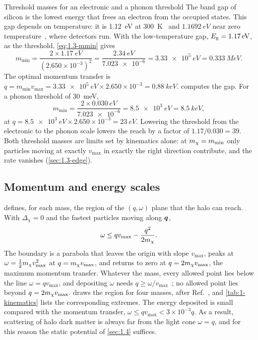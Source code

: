 \begin{workedexample}{Threshold masses for an electronic and a phonon threshold}\label{we:1-mmin}
The band gap of silicon is the lowest energy that frees an electron from the occupied states. This gap depends on temperature: it is \SI{1.12}{eV} at \SI{300}{K}~\cite[Table~I]{ramanathan2020ionization} and $\SI{1.1692}{eV}$ near zero temperature~\cite[Eq.~(11)]{ramanathan2020ionization}, where detectors run. With the low-temperature gap, $E_{\mathrm{g}} = \SI{1.17}{eV}$, as the threshold, \cref{eq:1.3-mmin} gives
\begin{equation*}
  m_{\mathrm{min}} = \frac{2 \times \SI{1.17}{eV}}{(2.650\times10^{-3})^2} = \frac{\SI{2.34}{eV}}{\num{7.023e-6}} = \SI{3.33e5}{eV} = \SI{0.333}{MeV}.
\end{equation*}
The optimal momentum transfer is $q = m_{\mathrm{min}}v_{\mathrm{max}} = \SI{3.33e5}{eV}\times 2.650\times10^{-3} = \SI{0.88}{keV}$.  computes the gap. For a phonon threshold of \SI{30}{meV},
\begin{equation*}
  m_{\mathrm{min}} = \frac{2 \times \SI{0.030}{eV}}{\num{7.023e-6}} = \SI{8.5e3}{eV} = \SI{8.5}{keV},
\end{equation*}
at $q = \SI{8.5e3}{eV}\times 2.650\times10^{-3} = \SI{23}{eV}$. Lowering the threshold from the electronic to the phonon scale lowers the reach by a factor of $1.17/0.030 = 39$. Both threshold masses are limits set by kinematics alone: at $m_{\chi} = m_{\mathrm{min}}$ only particles moving at exactly $v_{\mathrm{max}}$ in exactly the right direction contribute, and the rate vanishes (\cref{sec:1.3-edge}).
\end{workedexample}

\subsection{Momentum and energy scales}

 defines, for each mass, the region of the $(q, \omega)$ plane that the halo can reach. With $\Delta_\chi = 0$ and the fastest particles moving along $\bm{q}$,
\begin{equation}
  \omega \le q v_{\mathrm{max}} - \frac{q^2}{2m_{\chi}} .
  \label{eq:1.3-region}
\end{equation}
The boundary is a parabola that leaves the origin with slope $v_{\mathrm{max}}$, peaks at $\omega = \tfrac12m_{\chi} v_{\mathrm{max}}^2$ at $q = m_{\chi} v_{\mathrm{max}}$, and returns to zero at $q = 2m_{\chi} v_{\mathrm{max}}$, the maximum momentum transfer. Whatever the mass, every allowed point lies below the line $\omega = qv_{\mathrm{max}}$, and depositing $\omega$ needs $q \ge \omega/v_{\mathrm{max}}$~\cite[Eq.~(122)]{kahn2022searches}; no allowed point lies beyond $q = 2m_{\chi} v_{\mathrm{max}}$.  draws the region for four masses, after Ref.~\cite[Fig.~1]{kahn2022searches}, and \cref{tab:1-kinematics} lists the corresponding extremes. The energy deposited is small compared with the momentum transfer, $\omega \le qv_{\mathrm{max}} < 3\times10^{-3}q$. As a result, scattering of halo dark matter is always far from the light cone $\omega = q$, and for this reason the static potential of \cref{sec:1.4} suffices.

